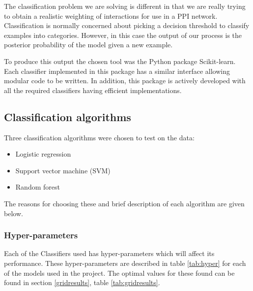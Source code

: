 The classification problem we are solving is different in that we are really trying to obtain a realistic weighting of interactions for use in a PPI network.
Classification is normally concerned about picking a decision threshold to classify examples into categories.
However, in this case the output of our process is the posterior probability of the model given a new example.

To produce this output the chosen tool was the Python package Scikit-learn\autocite{pedregosa_scikit-learn:_2011}.
Each classifier implemented in this package has a similar interface allowing modular code to be written.
In addition, this package is actively developed with all the required classifiers having efficient implementations.

\subsection{Classification algorithms}

Three classification algorithms were chosen to test on the data:

\begin{itemize}
    \item Logistic regression
    \item Support vector machine (SVM)
    \item Random forest
\end{itemize}

The reasons for choosing these and brief description of each algorithm are given below.

\subsubsection{Hyper-parameters}
Each of the Classifiers used has hyper-parameters which will affect its performance.
These hyper-parameters are described in table \ref{tab:hyper} for each of the models used in the project.
The optimal values for these found can be found in section \ref{gridresults}, table \ref{tab:gridresults}.

